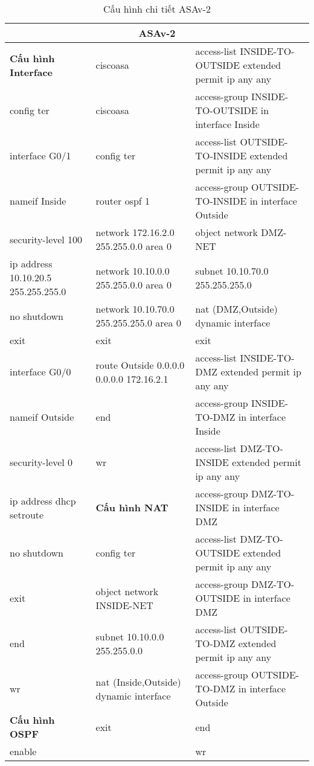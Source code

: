 \begin{table}[H]
\centering
\begin{tabular}{|p{3.5cm}|p{3.5cm}|p{9.5cm}|}
\hline
\multicolumn{3}{|c|}{ASAv-2} \\
\hline
\textbf{Cấu hình Interface} & ciscoasa & access-list INSIDE-TO-OUTSIDE extended permit ip any any \\
config ter	&ciscoasa&	access-group INSIDE-TO-OUTSIDE in interface Inside\\

interface G0/1	&config ter&	access-list OUTSIDE-TO-INSIDE extended permit ip any any\\
nameif Inside &router ospf 1&	access-group OUTSIDE-TO-INSIDE in interface Outside\\
security-level 100	&network 172.16.2.0 255.255.0.0 area 0&object network DMZ-NET\\
ip address 10.10.20.5 255.255.255.0	&network 10.10.0.0 255.255.0.0 area 0&		subnet 10.10.70.0 255.255.255.0\\
no shutdown	&	network 10.10.70.0 255.255.255.0 area 0&nat (DMZ,Outside) dynamic interface \\
exit	&exit&	exit\\
interface G0/0	&route Outside 0.0.0.0 0.0.0.0 172.16.2.1&	access-list INSIDE-TO-DMZ extended permit ip any any\\
nameif Outside	& end &	access-group INSIDE-TO-DMZ in interface Inside\\
security-level 0	&wr&	access-list DMZ-TO-INSIDE extended permit ip any any\\
ip address dhcp setroute	&\textbf{Cấu hình NAT}&	access-group DMZ-TO-INSIDE in interface DMZ\\
no shutdown	&config ter&	access-list DMZ-TO-OUTSIDE extended permit ip any any\\
exit	& object network INSIDE-NET&	access-group DMZ-TO-OUTSIDE in interface DMZ\\
end	&subnet 10.10.0.0 255.255.0.0&	access-list OUTSIDE-TO-DMZ extended permit ip any any\\
wr	&nat (Inside,Outside) dynamic interface&	access-group OUTSIDE-TO-DMZ in interface Outside\\
\textbf{Cấu hình OSPF}&exit&	end\\
enable& &	wr\\
\hline
\end{tabular}
\caption{Cấu hình chi tiết ASAv-2}
\end{table}

